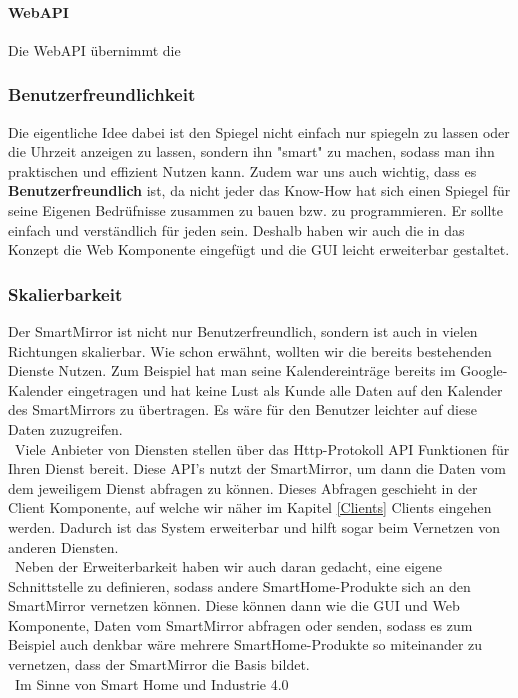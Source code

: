 \paragraph{WebAPI}
Die WebAPI übernimmt die 


\subsubsection{Benutzerfreundlichkeit}\label{Benutzerfreundlichkeit}
Die eigentliche Idee dabei ist den Spiegel nicht einfach nur spiegeln zu lassen oder die Uhrzeit anzeigen zu lassen, sondern ihn "smart" zu machen, sodass man ihn praktischen und effizient Nutzen kann. Zudem war uns auch wichtig, dass es \textbf{Benutzerfreundlich} ist, da nicht jeder das Know-How hat sich einen Spiegel für seine Eigenen Bedrüfnisse zusammen zu bauen bzw. zu programmieren. Er sollte einfach und verständlich für jeden sein. Deshalb haben wir auch die in das Konzept die Web Komponente eingefügt und die GUI leicht erweiterbar gestaltet.

\subsubsection{Skalierbarkeit}\label{Skalierbarkeit}
Der SmartMirror ist nicht nur Benutzerfreundlich, sondern ist auch in vielen Richtungen skalierbar.
Wie schon erwähnt, wollten wir die bereits bestehenden Dienste Nutzen. Zum Beispiel hat man seine Kalendereinträge bereits im Google-Kalender eingetragen und hat keine Lust als Kunde alle Daten auf den Kalender des SmartMirrors zu übertragen. Es wäre für den Benutzer leichter auf diese Daten zuzugreifen. \\\
Viele Anbieter von Diensten stellen über das Http-Protokoll API Funktionen für Ihren Dienst bereit. Diese API's nutzt der SmartMirror, um dann die Daten vom dem jeweiligem Dienst abfragen zu können. Dieses Abfragen geschieht in der Client Komponente, auf welche wir näher im Kapitel \ref{Clients} Clients eingehen werden. Dadurch ist das System erweiterbar und hilft sogar beim Vernetzen von anderen Diensten.\\\
Neben der Erweiterbarkeit haben wir auch daran gedacht, eine eigene Schnittstelle zu definieren, sodass andere SmartHome-Produkte sich an den SmartMirror vernetzen können. Diese können dann wie die GUI und Web Komponente, Daten vom SmartMirror abfragen oder senden, sodass es zum Beispiel auch denkbar wäre mehrere SmartHome-Produkte so miteinander zu vernetzen, dass der SmartMirror die Basis bildet.\\\
Im Sinne von Smart Home und Industrie 4.0




